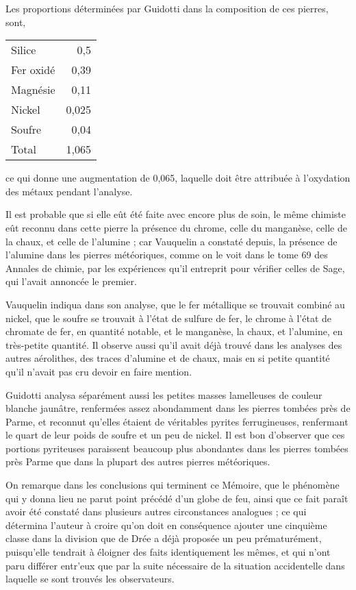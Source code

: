 \documentclass[a4paper, 12pt, oneside, french]{article}
\begin{document}
Les proportions déterminées par Guidotti dans la composition de ces pierres, sont,
\begin{table}[H]
    \centering
    \Fontauri
    \large
    \begin{tabular}{l r}
        Silice & 0,5 \\ 
        Fer oxidé & 0,39 \\
        Magnésie & 0,11 \\
        Nickel & 0,025 \\
        Soufre & 0,04 \\ \hline
        Total & 1,065 \\
    \end{tabular}
\end{table}
ce qui donne une augmentation de 0,065, laquelle doit être attribuée à l'oxydation des métaux pendant l'analyse.

Il est probable que si elle eût été faite avec encore plus de soin, le même chimiste eût reconnu dans cette pierre la présence du chrome, celle du manganèse, celle de la chaux, et celle de l'alumine ; car Vauquelin a constaté depuis, la présence de l'alumine dans les pierres météoriques, comme on le voit dans le tome 69 des Annales de chimie, par les expériences qu'il entreprit pour vérifier celles de Sage, qui l'avait annoncée le premier.

Vauquelin indiqua dans son analyse, que le fer métallique se trouvait combiné au nickel, que le soufre se trouvait à l'état de sulfure de fer, le chrome à l'état de chromate de fer, en quantité notable, et le manganèse, la chaux, et l'alumine, en très-petite quantité. Il observe aussi qu'il avait déjà trouvé dans les analyses des autres aérolithes, des traces d'alumine et de chaux, mais en si petite quantité qu'il n'avait pas cru devoir en faire mention.

Guidotti analysa séparément aussi les petites masses lamelleuses de couleur blanche jaunâtre, renfermées assez abondamment dans les pierres tombées près de Parme, et reconnut qu'elles étaient de véritables pyrites ferrugineuses, renfermant le quart de leur poids de soufre et un peu de nickel. Il est bon d'observer que ces portions pyriteuses paraissent beaucoup plus abondantes dans les pierres tombées près Parme que dans la plupart des autres pierres météoriques.

On remarque dans les conclusions qui terminent ce Mémoire, que le phénomène qui y donna lieu ne parut point précédé d'un globe de feu, ainsi que ce fait paraît avoir été constaté dans plusieurs autres circonstances analogues ; ce qui détermina l'auteur à croire qu'on doit en conséquence ajouter une cinquième classe dans la division que de Drée a déjà proposée un peu prématurément, puisqu'elle tendrait à éloigner des faits identiquement les mêmes, et qui n'ont paru différer entr'eux que par la suite nécessaire de la situation accidentelle dans laquelle se sont trouvés les observateurs.
\end{document}
